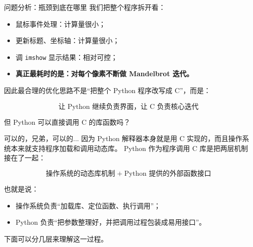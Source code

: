 \documentclass[aspectratio=169,11pt]{ctexbeamer}
\begin{document}
\begin{frame}{问题分析：瓶颈到底在哪里}
我们把整个程序拆开看：

\begin{itemize}
  \item 鼠标事件处理：计算量很小；
  \item 更新标题、坐标轴：计算量很小；
  \item 调 \texttt{imshow} 显示结果：相对可控；
  \item \textbf{真正最耗时的是：对每个像素不断做 Mandelbrot 迭代。}
\end{itemize}

\vspace{0.5em}
因此最合理的优化思路不是“把整个 Python 程序改写成 C”，而是：

\[
\boxed{\text{让 Python 继续负责界面，让 C 负责核心迭代}}
\]

但 Python 可以直接调用 C 的库函数吗？
\end{frame}

\begin{frame}{可以的，兄弟，可以的...}
因为 Python 解释器本身就是用 C 实现的，而且操作系统本来就支持程序加载和调用动态库。
Python 作为程序调用 C 库是把两层机制接在了一起：

\[
\boxed{
\text{操作系统的动态库机制}
\;+\;
\text{Python 提供的外部函数接口}
}
\]

\vspace{0.8em}
也就是说：

\begin{itemize}
  \item 操作系统负责“加载库、定位函数、执行调用”；
  \item Python 负责“把参数整理好，并把调用过程包装成易用接口”。
\end{itemize}

\vspace{0.8em}
下面可以分几层来理解这一过程。
\end{frame}
\end{document}
